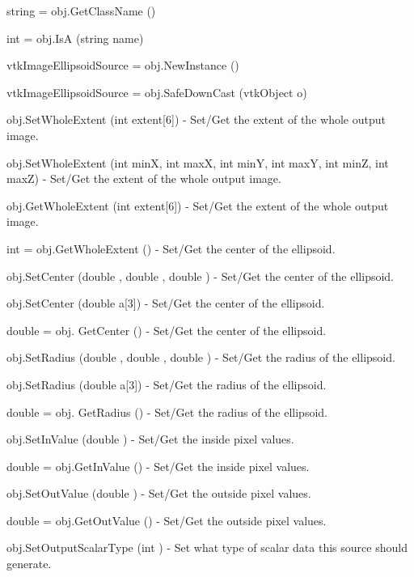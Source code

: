 \begin{DoxyItemize}
\item {\ttfamily string = obj.\-Get\-Class\-Name ()}  
\item {\ttfamily int = obj.\-Is\-A (string name)}  
\item {\ttfamily vtk\-Image\-Ellipsoid\-Source = obj.\-New\-Instance ()}  
\item {\ttfamily vtk\-Image\-Ellipsoid\-Source = obj.\-Safe\-Down\-Cast (vtk\-Object o)}  
\item {\ttfamily obj.\-Set\-Whole\-Extent (int extent\mbox{[}6\mbox{]})} -\/ Set/\-Get the extent of the whole output image.  
\item {\ttfamily obj.\-Set\-Whole\-Extent (int min\-X, int max\-X, int min\-Y, int max\-Y, int min\-Z, int max\-Z)} -\/ Set/\-Get the extent of the whole output image.  
\item {\ttfamily obj.\-Get\-Whole\-Extent (int extent\mbox{[}6\mbox{]})} -\/ Set/\-Get the extent of the whole output image.  
\item {\ttfamily int = obj.\-Get\-Whole\-Extent ()} -\/ Set/\-Get the center of the ellipsoid.  
\item {\ttfamily obj.\-Set\-Center (double , double , double )} -\/ Set/\-Get the center of the ellipsoid.  
\item {\ttfamily obj.\-Set\-Center (double a\mbox{[}3\mbox{]})} -\/ Set/\-Get the center of the ellipsoid.  
\item {\ttfamily double = obj. Get\-Center ()} -\/ Set/\-Get the center of the ellipsoid.  
\item {\ttfamily obj.\-Set\-Radius (double , double , double )} -\/ Set/\-Get the radius of the ellipsoid.  
\item {\ttfamily obj.\-Set\-Radius (double a\mbox{[}3\mbox{]})} -\/ Set/\-Get the radius of the ellipsoid.  
\item {\ttfamily double = obj. Get\-Radius ()} -\/ Set/\-Get the radius of the ellipsoid.  
\item {\ttfamily obj.\-Set\-In\-Value (double )} -\/ Set/\-Get the inside pixel values.  
\item {\ttfamily double = obj.\-Get\-In\-Value ()} -\/ Set/\-Get the inside pixel values.  
\item {\ttfamily obj.\-Set\-Out\-Value (double )} -\/ Set/\-Get the outside pixel values.  
\item {\ttfamily double = obj.\-Get\-Out\-Value ()} -\/ Set/\-Get the outside pixel values.  
\item {\ttfamily obj.\-Set\-Output\-Scalar\-Type (int )} -\/ Set what type of scalar data this source should generate.  

\end{DoxyItemize}
